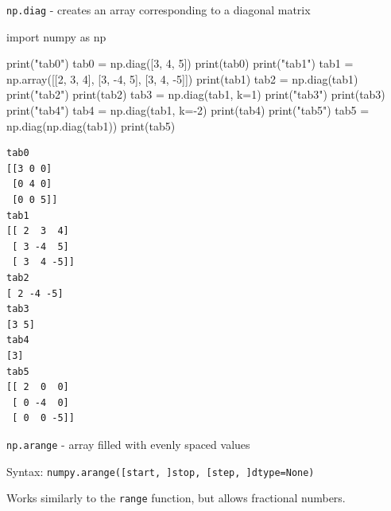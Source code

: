 \documentclass[
  english,
  letterpaper,
  DIV=11,
  numbers=noendperiod]{scrreprt}
\newenvironment{Shaded}{\begin{snugshade}}{\end{snugshade}}
\newcommand{\BuiltInTok}[1]{\textcolor[rgb]{0.00,0.23,0.31}{#1}}
\newcommand{\DecValTok}[1]{\textcolor[rgb]{0.68,0.00,0.00}{#1}}
\newcommand{\ImportTok}[1]{\textcolor[rgb]{0.00,0.46,0.62}{#1}}
\newcommand{\NormalTok}[1]{\textcolor[rgb]{0.00,0.23,0.31}{#1}}
\newcommand{\OperatorTok}[1]{\textcolor[rgb]{0.37,0.37,0.37}{#1}}
\newcommand{\StringTok}[1]{\textcolor[rgb]{0.13,0.47,0.30}{#1}}
\begin{document}
\texttt{np.diag} - creates an array corresponding to a diagonal matrix

\begin{Shaded}
\begin{Highlighting}[]
\ImportTok{import}\NormalTok{ numpy }\ImportTok{as}\NormalTok{ np}

\BuiltInTok{print}\NormalTok{(}\StringTok{"tab0"}\NormalTok{)}
\NormalTok{tab0 }\OperatorTok{=}\NormalTok{ np.diag([}\DecValTok{3}\NormalTok{, }\DecValTok{4}\NormalTok{, }\DecValTok{5}\NormalTok{])}
\BuiltInTok{print}\NormalTok{(tab0)}
\BuiltInTok{print}\NormalTok{(}\StringTok{"tab1"}\NormalTok{)}
\NormalTok{tab1 }\OperatorTok{=}\NormalTok{ np.array([[}\DecValTok{2}\NormalTok{, }\DecValTok{3}\NormalTok{, }\DecValTok{4}\NormalTok{], [}\DecValTok{3}\NormalTok{, }\OperatorTok{{-}}\DecValTok{4}\NormalTok{, }\DecValTok{5}\NormalTok{], [}\DecValTok{3}\NormalTok{, }\DecValTok{4}\NormalTok{, }\OperatorTok{{-}}\DecValTok{5}\NormalTok{]])}
\BuiltInTok{print}\NormalTok{(tab1)}
\NormalTok{tab2 }\OperatorTok{=}\NormalTok{ np.diag(tab1)}
\BuiltInTok{print}\NormalTok{(}\StringTok{"tab2"}\NormalTok{)}
\BuiltInTok{print}\NormalTok{(tab2)}
\NormalTok{tab3 }\OperatorTok{=}\NormalTok{ np.diag(tab1, k}\OperatorTok{=}\DecValTok{1}\NormalTok{)}
\BuiltInTok{print}\NormalTok{(}\StringTok{"tab3"}\NormalTok{)}
\BuiltInTok{print}\NormalTok{(tab3)}
\BuiltInTok{print}\NormalTok{(}\StringTok{"tab4"}\NormalTok{)}
\NormalTok{tab4 }\OperatorTok{=}\NormalTok{ np.diag(tab1, k}\OperatorTok{={-}}\DecValTok{2}\NormalTok{)}
\BuiltInTok{print}\NormalTok{(tab4)}
\BuiltInTok{print}\NormalTok{(}\StringTok{"tab5"}\NormalTok{)}
\NormalTok{tab5 }\OperatorTok{=}\NormalTok{ np.diag(np.diag(tab1))}
\BuiltInTok{print}\NormalTok{(tab5)}
\end{Highlighting}
\end{Shaded}

\begin{verbatim}
tab0
[[3 0 0]
 [0 4 0]
 [0 0 5]]
tab1
[[ 2  3  4]
 [ 3 -4  5]
 [ 3  4 -5]]
tab2
[ 2 -4 -5]
tab3
[3 5]
tab4
[3]
tab5
[[ 2  0  0]
 [ 0 -4  0]
 [ 0  0 -5]]
\end{verbatim}

\texttt{np.arange} - array filled with evenly spaced values

Syntax:
\texttt{numpy.arange({[}start,\ {]}stop,\ {[}step,\ {]}dtype=None)}

Works similarly to the \texttt{range} function, but allows fractional
numbers.
\end{document}
